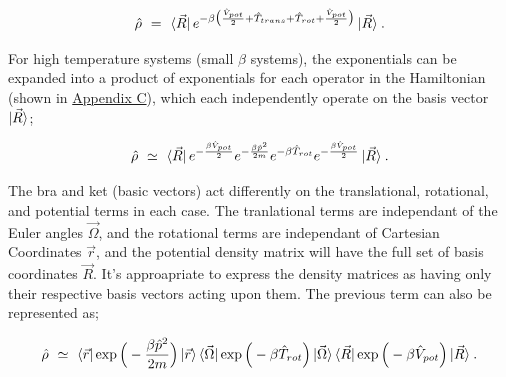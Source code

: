 \documentclass[11pt]{article}
\begin{document}
\begin{equation} \label{wr-eq-38-1}
\hat{\rho} \hspace{0.125cm} = \hspace{0.125cm} \bra{\vec{R}}  e^{ - \beta \big( \frac{\hat{V}_{pot}}{2} + \hat{T}_{trans} + \hat{T}_{rot} + \frac{\hat{V}_{pot}}{2} \big)} \ket{\vec{R}} \hspace{0.025cm} . 
\end{equation}

For high temperature systems (small \begin{math} \beta \end{math} systems), the exponentials can be expanded into a product of exponentials for each operator in the Hamiltonian (shown in \hyperlink{wr-appendix-c}{Appendix C}), which each independently operate on the basis vector \begin{math} \ket{\vec{R}} \end{math};

\begin{equation} \label{wr-eq-45-1}
\hat{\rho} \hspace{0.125cm} \simeq \hspace{0.125cm} \bra{\vec{R}} e^{- \frac{ \beta \hat{V}_{pot}}{2}} e^{- \frac{\beta \hat{p}^2}{2 m}} e^{-\beta \hat{T}_{rot}} e^{- \frac{ \beta \hat{V}_{pot}}{2}}  \ket{\vec{R}} \hspace{0.025cm} . \end{equation}

The bra and ket (basic vectors) act differently on the translational, rotational, and potential terms in each case. The tranlational terms are independant of the Euler angles \begin{math} \vec{\Omega} \end{math}, and the rotational terms are independant of Cartesian Coordinates \begin{math} \vec{r} \end{math}, and the potential density matrix will have the full set of basis coordinates \begin{math} \vec{R} \end{math}. It's approapriate to express the density matrices as having only their respective basis vectors acting upon them. The previous term can also be represented as;

\begin{equation} \label{wr-eq-46-1}
\hat{\rho} \hspace{0.125cm} \simeq \hspace{0.125cm} \bra{\vec{r}} \exp \Big( - \frac{\beta \hat{p}^2}{2 m} \Big) \ket{\vec{r}} \bra{\vec{\Omega}} \exp \Big( - \beta \hat{T}_{rot} \Big) \ket{\vec{\Omega}} \bra{\vec{R}} \exp \Big( - \beta \hat{V}_{pot} \Big) \ket{\vec{R}} \hspace{0.025cm} . \end{equation}
\end{document}
